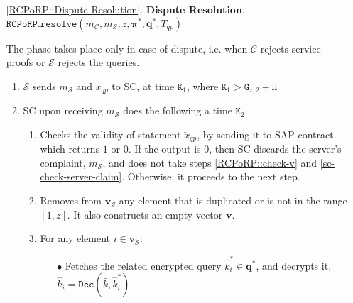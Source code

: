 \begin{enumerate}
\item[\ref{RCPoRP::Dispute-Resolution}.] \textbf{Dispute Resolution}. \label{RCPoRP2::Dispute-Resolution2} $\mathtt{RCPoRP}. \mathtt{resolve}(m_{\scriptscriptstyle \mathcal{C}},m_{\scriptscriptstyle \mathcal{S}}, z, {\bm{\pi}}^{\scriptscriptstyle *}, \bm{q}^{\scriptscriptstyle *},  T_{\scriptscriptstyle qp})$


The phase takes place only in  case of dispute, i.e. when $\mathcal C$ rejects service proofs or $\mathcal S$ rejects the queries. %

\begin{enumerate}

\item $\mathcal S$  sends ${m}_{\scriptscriptstyle\mathcal S}$ and $\ddot{x}_{\scriptscriptstyle qp}$ to SC, at time $\texttt{K}_{\scriptscriptstyle 1}$, where $\texttt{K}_{\scriptscriptstyle 1}>\texttt{G}_{\scriptscriptstyle z,2} + \texttt{H}$

\item SC upon receiving ${m}_{\scriptscriptstyle\mathcal S}$ does the following a time $\texttt{K}_{\scriptscriptstyle 2}$. 
\begin{enumerate}

\item Checks the validity of  statement $\ddot{x}_{\scriptscriptstyle qp}$, by  sending it to SAP contract which  returns   $1$ or $0$. If the output is $0$, then SC discards the server's complaint, $m_{\scriptscriptstyle\mathcal S}$, and does not take steps \ref{RCPoRP::check-v} and \ref{sc-check-server-claim}. Otherwise, it proceeds to the next step.


\item\label{RCPoRP2::check-v} Removes from $ {\bm{v}}_{\scriptscriptstyle\mathcal{S}}$ any element that is duplicated or is not in the range $[1,z]$. It also constructs an empty vector $ {\bm{v}}$.

\item\label{sc-check-server-claim2}  For any element $i\in {\bm{v}}_{\scriptscriptstyle\mathcal{S}}$:
\begin{itemize}

\item[$\bullet$] Fetches the related encrypted query $\hat{k}^{\scriptscriptstyle *}_{\scriptscriptstyle i}\in \bm{q}^{\scriptscriptstyle *}$, and   decrypts it, $\hat{k}_{\scriptscriptstyle i}=\mathtt{Dec}(\bar{k},\hat{k}^{\scriptscriptstyle *}_{\scriptscriptstyle i})$
 

\end{itemize}
\end{enumerate}
\end{enumerate}
\end{enumerate}
